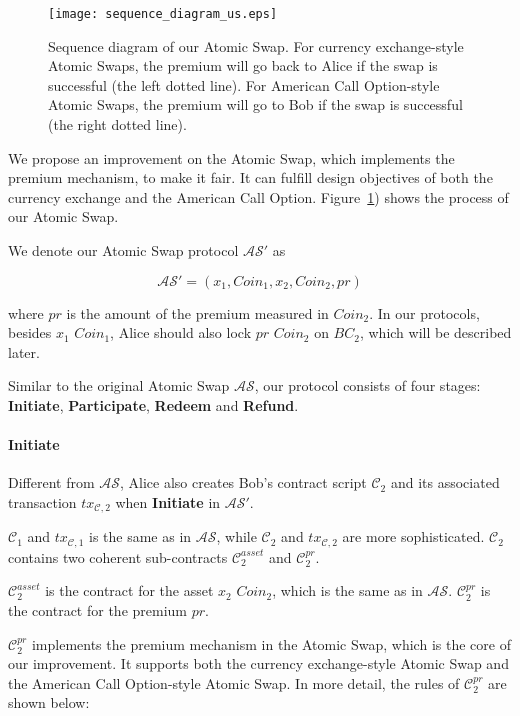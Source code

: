 \begin{figure}[htp]
    \texttt{[image: sequence\_diagram\_us.eps]}
    \caption{Sequence diagram of our Atomic Swap.
    For currency exchange-style Atomic Swaps, the premium will go back to Alice if the swap is successful (the left dotted line).
    For American Call Option-style Atomic Swaps, the premium will go to Bob if the swap is successful (the right dotted line).}
    \label{fig:sequence_diagram_us}
\end{figure}

We propose an improvement on the Atomic Swap, which implements the premium mechanism, to make it fair.
It can fulfill design objectives of both the currency exchange and the American Call Option.
Figure~\ref{fig:sequence_diagram_us}) shows the process of our Atomic Swap.

We denote our Atomic Swap protocol $\mathcal{AS}'$ as

$$\mathcal{AS}' = (x_1, Coin_1, x_2, Coin_2, pr)$$

where $pr$ is the amount of the premium measured in $Coin_2$.
In our protocols, besides $x_1$ $Coin_1$, Alice should also lock $pr$ $Coin_2$ on $BC_2$, which will be described later.

Similar to the original Atomic Swap $\mathcal{AS}$, our protocol consists of four stages:
\textbf{Initiate}, \textbf{Participate}, \textbf{Redeem} and \textbf{Refund}.

\paragraph{\textbf{Initiate}}
Different from $\mathcal{AS}$, Alice also creates Bob's contract script $\mathcal{C}_2$ and its associated transaction $tx_{\mathcal{C}, 2}$ when \textbf{Initiate} in $\mathcal{AS}'$.

$\mathcal{C}_1$ and $tx_{\mathcal{C}, 1}$ is the same as in $\mathcal{AS}$,
while $\mathcal{C}_2$ and $tx_{\mathcal{C}, 2}$ are more sophisticated.
$\mathcal{C}_2$ contains two coherent sub-contracts $\mathcal{C}^{asset}_2$ and $\mathcal{C}^{pr}_2$.

$\mathcal{C}^{asset}_2$ is the contract for the asset $x_2$ $Coin_2$, which is the same as in $\mathcal{AS}$.
$\mathcal{C}^{pr}_2$ is the contract for the premium $pr$.

$\mathcal{C}^{pr}_2$ implements the premium mechanism in the Atomic Swap, which is the core of our improvement.
It supports both the currency exchange-style Atomic Swap and the American Call Option-style Atomic Swap.
In more detail, the rules of $\mathcal{C}^{pr}_2$ are shown below:

